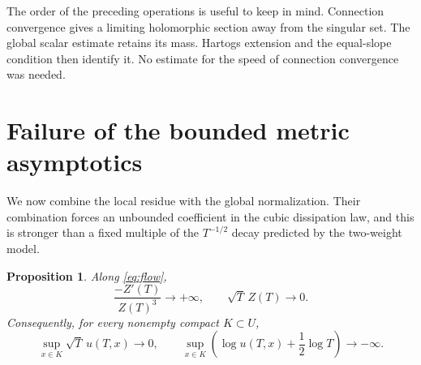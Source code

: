 \documentclass[11pt]{amsart}
\newtheorem{proposition}[theorem]{Proposition}
\theoremstyle{definition}
\theoremstyle{remark}
\begin{document}
The order of the preceding operations is useful to keep in mind.
Connection convergence gives a limiting holomorphic section away from
the singular set. The global scalar estimate retains its mass. Hartogs
extension and the equal-slope condition then identify it. No estimate
for the speed of connection convergence was needed.

\section{Failure of the bounded metric asymptotics}\label{sec:obstruction}

We now combine the local residue with the global normalization. Their
combination forces an unbounded coefficient in the cubic dissipation
law, and this is stronger than a fixed multiple of the $T^{-1/2}$ decay predicted by the two-weight model.

\begin{proposition}\label{prop:faster-decay}
Along \eqref{eq:flow},
\begin{equation}\label{eq:divergent-dissipation}
 \frac{-Z'(T)}{Z(T)^3}\longrightarrow+\infty,
 \qquad \sqrt T\,Z(T)\longrightarrow0.
\end{equation}
Consequently, for every nonempty compact $K\subset U$,
\begin{equation}\label{eq:compact-decay}
 \sup_{x\in K}\sqrt T\,u(T,x)\longrightarrow0,
 \qquad
 \sup_{x\in K}\left(\log u(T,x)+\frac12\log T\right)
        \longrightarrow-\infty.
\end{equation}
\end{proposition}
\end{document}
